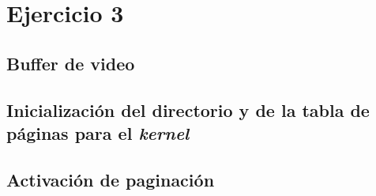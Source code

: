 \section{Ejercicio 3}
\par{}

\subsection*{Buffer de video}
\par{}


\subsection*{Inicialización del directorio y de la tabla de páginas para el \textit{kernel}}
\par{}

\subsection*{Activación de paginación}
\par{}


\clearpage